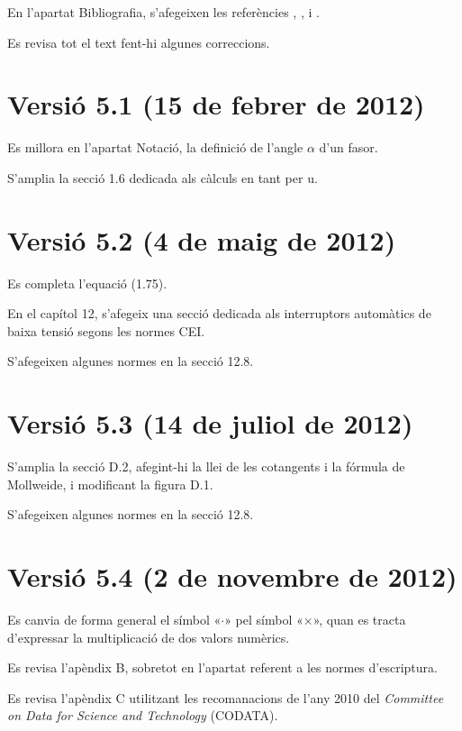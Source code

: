 En l'apartat Bibliografia, s'afegeixen les referències \cite{GRZ}, \cite{DUN}, \cite{REI} i \cite{TLE}.

Es revisa tot el text fent-hi algunes correccions.

\section*{Versió 5.1 (15 de febrer de 2012)}

Es millora en l'apartat Notació, la definició de l'angle $\alpha$ d'un fasor.

S'amplia la secció 1.6 dedicada als càlculs en tant per u.


\section*{Versió 5.2 (4 de maig de 2012)}

Es completa l'equació (1.75).

En el capítol 12, s'afegeix una secció dedicada als interruptors automàtics de baixa tensió segons les normes CEI.

S'afegeixen algunes normes en la secció 12.8.

\section*{Versió 5.3 (14 de juliol de 2012)}

S'amplia la secció D.2, afegint-hi la llei de les cotangents i la fórmula de Mollweide, i modificant  la figura D.1.

S'afegeixen algunes normes en la secció 12.8.

\section*{Versió 5.4 (2 de novembre de 2012)}

Es canvia de forma general el símbol «$\cdot$» pel símbol «$\times$», quan es tracta d'expressar la multiplicació de dos valors numèrics.

Es revisa l'apèndix B, sobretot en l'apartat referent a les normes d'escriptura.

Es revisa l'apèndix C utilitzant les recomanacions de l'any 2010 del \textit{Committee on Data for Science and Technology} (CODATA).

